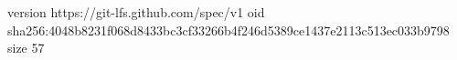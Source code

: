 version https://git-lfs.github.com/spec/v1
oid sha256:4048b8231f068d8433bc3cf33266b4f246d5389ce1437e2113c513ec033b9798
size 57
